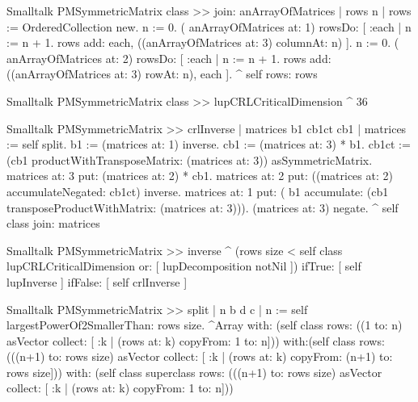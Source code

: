\begin{displaycode}{Smalltalk}
PMSymmetricMatrix class >> join: anArrayOfMatrices
    | rows n |
    rows := OrderedCollection new.
    n := 0.
    ( anArrayOfMatrices at: 1) rowsDo:
        [ :each |
          n := n + 1.
          rows add: each, ((anArrayOfMatrices at: 3) columnAt: n) ].
    n := 0.
    ( anArrayOfMatrices at: 2) rowsDo:
        [ :each |
          n := n + 1.
          rows add: ((anArrayOfMatrices at: 3) rowAt: n), each ].
    ^ self rows: rows 
\end{displaycode}

\begin{displaycode}{Smalltalk}
PMSymmetricMatrix class >> lupCRLCriticalDimension
    ^ 36
\end{displaycode}

\begin{displaycode}{Smalltalk}
PMSymmetricMatrix >> crlInverse
    | matrices b1 cb1ct cb1 |
    matrices := self split.
    b1 := (matrices at: 1) inverse.
    cb1 := (matrices at: 3) * b1.
    cb1ct := (cb1 productWithTransposeMatrix: (matrices at: 3)) 
                asSymmetricMatrix.
    matrices at: 3 put: (matrices at: 2) * cb1.
    matrices at: 2 put: ((matrices at: 2) accumulateNegated: cb1ct) 
                                                              inverse.
    matrices at: 1 put: ( b1 accumulate: (cb1 
                       transposeProductWithMatrix: (matrices at: 3))).
    (matrices at: 3) negate.
    ^ self class join: matrices
\end{displaycode}

\begin{displaycode}{Smalltalk}
PMSymmetricMatrix >> inverse
    ^ (rows size < self class lupCRLCriticalDimension or: 
                                           [ lupDecomposition notNil ]) 
            ifTrue: [ self lupInverse ]
            ifFalse: [ self crlInverse ]
\end{displaycode}

\begin{displaycode}{Smalltalk}
PMSymmetricMatrix >> split
    | n b d c |
    n := self largestPowerOf2SmallerThan: rows size.
    ^Array with: (self class rows: ((1 to: n) asVector collect: [ 
                               :k | (rows at: k) copyFrom: 1 to: n]))
              with:(self class rows: (((n+1) to: rows size) 
      asVector collect: [ :k | (rows at: k) copyFrom: (n+1) to: rows 
      size]))
              with: (self class superclass rows: (((n+1) to: rows 
     size) asVector collect: [ :k | (rows at: k) copyFrom: 1 to: n]))
\end{displaycode}

